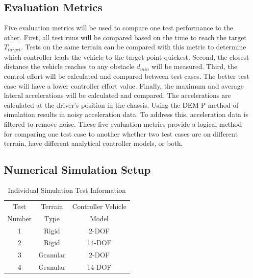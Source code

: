 \documentclass[12pt,twocolumn]{article}
\begin{document}

\subsection{Evaluation Metrics}\label{ss:Metrics}
Five evaluation metrics will be used to compare one test performance to the other. First, all test runs will be compared based on the time to reach the target $T_{target}$. Tests on the same terrain can be compared with this metric to determine which controller leads the vehicle to the target point quickest. Second, the closest distance the vehicle reaches to any obstacle $d_{min}$ will be measured. Third, the control effort will be calculated and compared between test cases. The better test case will have a lower controller effort value. Finally, the maximum and average lateral accelerations will be calculated and compared. The accelerations are calculated at the driver's position in the chassis. Using the DEM-P method of simulation results in noisy acceleration data. To address this, acceleration data is filtered to remove noise. These five evaluation metrics provide a logical method for comparing one test case to another whether two test cases are on different terrain, have different analytical controller models, or both. 


\subsection{Numerical Simulation Setup }\label{ss:Setup}

\begin{table}
\begin{center}
	\begin{tabular}{||c |c | c||} 
		\hline
		Test  & Terrain  & Controller Vehicle \\
		Number &  Type & Model\\ [0.5ex] 	
		\hline\hline
		1 & Rigid & 2-DOF \\ 
		\hline
		2 & Rigid & 14-DOF \\
		\hline
		3 & Granular & 2-DOF \\
		\hline
		4 & Granular & 14-DOF \\
		\hline
	\end{tabular}
\end{center}
\caption{Individual Simulation Test Information}
\label{t:TestMatrix}
\end{table}
\end{document}
